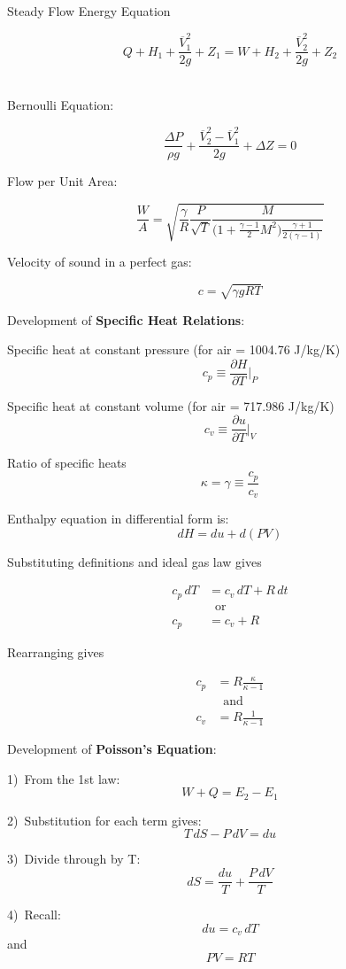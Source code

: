 \documentclass[
]{book}
\begin{document}
Steady Flow Energy Equation

\[
Q + H_1 + \frac{\overline{V}_1^2}{2g} + Z_1 = W + H_2 + \frac{\overline{V}_2^2}{2g} + Z_2
\]~

Bernoulli Equation:

\[
\frac{\Delta P}{\rho g} + \frac{\overline{V}_2^2 - \overline{V}_1^2}{2g} + \Delta Z = 0
\]

Flow per Unit Area:

\[
\frac{W}{A} = \sqrt{\frac{\gamma}{R} \frac{P}{\sqrt{T}} \frac{M}{
  \Big( 1 + \frac{\gamma - 1}{2} M^2 \Big) \frac{\gamma + 1}{2 (\gamma - 1)}
}}
\]

Velocity of sound in a perfect gas:

\[
c = \sqrt{\gamma g R T}
\]

Development of \textbf{Specific Heat Relations}:

Specific heat at constant pressure (for air = 1004.76 J/kg/K)
\[
c_p \equiv \frac{\partial H}{\partial T} \Bigg\rvert_{P}
\]

Specific heat at constant volume (for air = 717.986 J/kg/K)
\[
c_v \equiv \frac{\partial u}{\partial T} \Bigg\rvert_{V}
\]

Ratio of specific heats
\[
\kappa = \gamma \equiv \frac{c_p}{c_v}
\]

Enthalpy equation in differential form is: \[dH = du + d(PV)\]

Substituting definitions and ideal gas law gives

\begin{align}
c_p \, dT &= c_v \, dT + R \, dt\\
&\;\;\mathrm{or} \\
c_p &= c_v + R
\end{align}

Rearranging gives

\begin{align}
c_p &= R \frac{\kappa}{\kappa - 1}\\
&\;\;\mathrm{and} \\
c_v &= R \frac{1}{\kappa - 1}
\end{align}

Development of \textbf{Poisson's Equation}:

1)~From the 1st law: \[W+Q = E_2-E_1\]

2)~Substitution for each term gives: \[T\,dS - P\,dV = du\]

3)~Divide through by T: \[dS = \frac{du}{T} + \frac{P\,dV}{T}\]

4)~Recall: \[du = c_v\,dT\] and \[PV = RT\]
\end{document}
